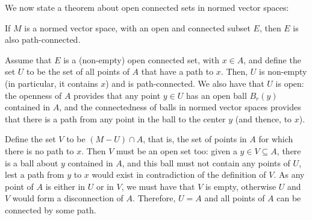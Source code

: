 We now state a theorem about open connected sets in normed vector spaces:
\begin{btheorem}{}{}
If $M$ is a normed vector space, with an open and connected subset $E$, then $E$ is also path-connected.
\end{btheorem}
\begin{bproof}{}{}
Assume that $E$ is a (non-empty) open connected set, with $x\in A$, and define the set $U$ to be the set of all points of $A$ that have a path to $x$. Then, $U$ is non-empty (in particular, it contains $x$) and is path-connected. We also have that $U$ is open: the openness of $A$ provides that any point $y\in U$ has an open ball $B_{r}(y)$ contained in $A$, and the connectedness of balls in normed vector spaces provides that there is a path from any point in the ball to the center $y$ (and thence, to $x$).

Define the set $V$ to be \mbox{$(M -  U)\cap A$}, that is, the set of points in $A$ for which there is no path to $x$. Then $V$ must be an open set too: given a \mbox{$y\in V \subseteq A$}, there is a ball about $y$ contained in $A$, and this ball must not contain any points of $U$, lest a path from $y$ to $x$ would exist in contradiction of the definition of $V$. As any point of $A$ is either in $U$ or in $V$, we must have that $V$ is empty, otherwise $U$ and $V$ would form a disconnection of $A$. Therefore, $U = A$ and all points of $A$ can be connected by some path.
\eop
\end{bproof}